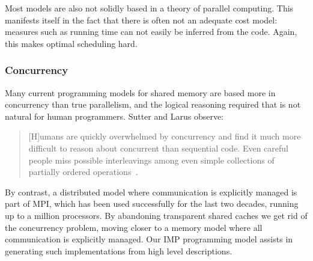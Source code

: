 Most models are also not solidly based in a theory of parallel
  computing. This manifests itself in the fact that there is often not
  an adequate cost model: measures such as running time can not easily
  be inferred from the code. Again, this makes optimal scheduling hard.



\subsubsection{Concurrency}
\label{sec:SWConcurrency}


Many current programming models for shared memory are based more in
concurrency than true parallelism, and the logical reasoning required
that is not natural for human programmers.  Sutter and Larus observe:
 \begin{quote}
[H]umans are quickly overwhelmed by concurrency and find it much more
difficult to reason about concurrent than sequential code. Even
careful people miss possible interleavings among even simple
collections of partially ordered operations~\cite{Sutter_2005}.
 \end{quote}
By contrast, a distributed model where communication is explicitly managed
is part of \ac{MPI}, which has been used successfully 
for the last two decades, running up to a million processors.
By abandoning transparent shared caches we get rid of the concurrency problem, 
moving closer to a memory model where all communication is
explicitly managed. Our \ac{IMP} programming model assists in generating
such implementations from high level descriptions.

